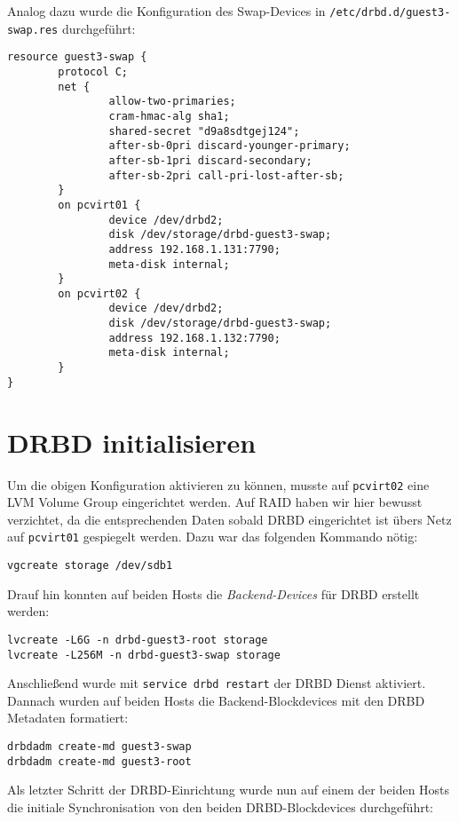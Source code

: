 Analog dazu wurde die Konfiguration des Swap-Devices in \verb|/etc/drbd.d/guest3-swap.res| durchgeführt:
\setupVerbatimOut
\begin{verbatim}
resource guest3-swap {
        protocol C;
        net {
                allow-two-primaries;
                cram-hmac-alg sha1;
                shared-secret "d9a8sdtgej124";
                after-sb-0pri discard-younger-primary;
                after-sb-1pri discard-secondary;
                after-sb-2pri call-pri-lost-after-sb;
        }
        on pcvirt01 {
                device /dev/drbd2;
                disk /dev/storage/drbd-guest3-swap;
                address 192.168.1.131:7790;
                meta-disk internal;
        }
        on pcvirt02 {
                device /dev/drbd2;
                disk /dev/storage/drbd-guest3-swap;
                address 192.168.1.132:7790;
                meta-disk internal;
        }
}
\end{verbatim}


\section{DRBD initialisieren}
Um die obigen Konfiguration aktivieren zu können, musste auf \verb#pcvirt02# eine LVM Volume Group eingerichtet werden. Auf RAID haben wir hier bewusst verzichtet, da die entsprechenden Daten sobald DRBD eingerichtet ist übers Netz auf \verb#pcvirt01# gespiegelt werden. Dazu war das folgenden Kommando nötig:
\setupVerbatimOut
\begin{verbatim}
vgcreate storage /dev/sdb1 
\end{verbatim}

Drauf hin konnten auf beiden Hosts die \emph{Backend-Devices} für DRBD erstellt werden:
\setupVerbatimOut
\begin{verbatim}
lvcreate -L6G -n drbd-guest3-root storage
lvcreate -L256M -n drbd-guest3-swap storage
\end{verbatim}

Anschließend wurde mit \texttt{service drbd restart} der DRBD Dienst aktiviert. Dannach wurden auf beiden Hosts die Backend-Blockdevices mit den DRBD Metadaten formatiert:
\setupVerbatimOut
\begin{verbatim}
drbdadm create-md guest3-swap
drbdadm create-md guest3-root
\end{verbatim}

Als letzter Schritt der DRBD-Einrichtung wurde nun auf einem der beiden Hosts die initiale Synchronisation von den beiden DRBD-Blockdevices durchgeführt:

